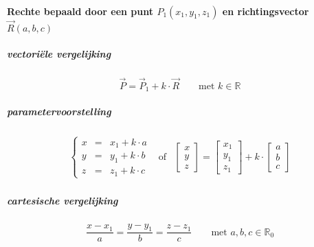 \paragraph{Rechte bepaald door een punt $P_1(x_1,y_1,z_1)$ en richtingsvector $\vec R(a,b,c)$}
\label{sec:RechtePuntRichting}
  \subparagraph{vectoriële vergelijking}
  \label{sec:RechtePuntRichtingVECTOR}
    \[
      \vec P = \vec P_1 + k \cdot \vec R \qquad \textrm{met $k \in \mathbb{R}$}
    \]
  \subparagraph{parametervoorstelling}
  \label{sec:RechtePuntRichtingPARAM}
    \[
      \begin{array}{lcr}
        \left\{
          \begin{array}{rcl}
             x &=& x_1 + k \cdot a\\
             y &=& y_1 + k \cdot b\\
             z &=& z_1 + k \cdot c
          \end{array}%
        \right. &%
       \textrm{of} &%
        \left[
          \begin{array}{c}
            x\\ y\\  z
          \end{array}
         \right]
        =
         \left[
           \begin{array}{c}
             x_1\\ y_1\\ z_1
           \end{array}
         \right]
       + k \cdot
         \left[
           \begin{array}{c}
             a\\ b\\ c
           \end{array}
         \right]
     \end{array}
   \]
  \subparagraph{cartesische vergelijking}
  \label{sec:RechtePuntRichtingCART}
    \[
      \frac{x-x_1}{a} = \frac{y-y_1}{b} = \frac{z-z_1}{c} \qquad \textrm{met $a,b,c \in \mathbb{R}_0$} 
    \]


